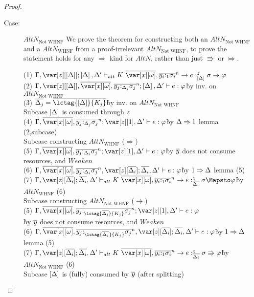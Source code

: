 \begin{proof}
\begin{description}
\item[Case:] $AltN_{\textrm{Not WHNF}}$
    We prove the theorem for constructing both an $AltN_{\textrm{Not WHNF}}$
        and a $AltN_{\textrm{WHNF}}$ from a proof-irrelevant $AltN_{\textrm{Not
        WHNF}}$, to prove the statement holds for any $\Rightarrow$ kind for
        $AltN$, rather than just $\Rrightarrow$ or $\Mapsto$.
\begin{tabbing}
    (1) $\G, \z[\irr{\D}]; \irr{\D}, \D' \vdash_{alt} K~\ov{\xo},\ov{y_i{:}_{1}\s_i}^n\to e :^z_{\irr{\D}} \s \Rrightarrow \vp$\\
    (2) $\G,\z[\irr{\D}],\ov{\xo},\ov{y_j{:}_{\D_j}\s_j}^n; \irr{\D}, \D' \vdash e : \vp$\`by inv. on $AltN_{\textrm{Not WHNF}}$\\
    (3) $\ov{\D_j} = \ov{\lctag{\irr{\D}}{K_j}}$\`by inv. on $AltN_{\textrm{Not WHNF}}$\\
    Subcase $\left[\Delta\right]$ is consumed through $z$\\
    (4) $\G,\ov{\xo},\ov{y_j{:}_{\D_j}\s_j}^n; \z[1], \D' \vdash e : \vp$\`by $\Delta \Rightarrow 1$ lemma (2,subcase)\\
    Subcase constructing $AltN_{\textrm{WHNF}}$ ($\Mapsto$)\\
    (5) $\G,\ov{\xo},\ov{y_j{:}_{\D_i}\s_j}^n; \z[1], \D' \vdash e : \vp$\`by $\overline{y}$ does not consume resources, and $Weaken$\\
    (6) $\G,\ov{\xo},\ov{y_j{:}_{\D_i}\s_j}^n, \z[\ov{\D_i}]; \ov{\D_i}, \D' \vdash e : \vp$\`by $1 \Rightarrow \Delta$ lemma (5)\\
    (7) $\G, \z[\ov{\D_i}]; \ov{\D_i}, \D' \vdash_{alt} K~\ov{\xo},\ov{y_i{:}_{1}\s_i}^n \to e :^z_{\ov{\D_i}} \s \Mapsto \vp$\`by $AltN_{\textrm{WHNF}}$ (6)\\
    Subcase constructing $AltN_{\textrm{Not WHNF}}$ ($\Rrightarrow$)\\
    (5) $\G,\ov{\xo},\ov{y_j{:}_{\lctag{\ov{\D_i}}{K_j}}\s_j}^n; \z[1], \D' \vdash e : \vp$\\\`by $\overline{y}$ does not consume resources, and $Weaken$\\
    (6) $\G,\ov{\xo},\ov{y_j{:}_{\lctag{\ov{\D_i}}{K_j}}\s_j}^n, \z[\ov{\D_i}]; \ov{\D_i}, \D' \vdash e : \vp$\`by $1 \Rightarrow \Delta$ lemma (5)\\
    (7) $\G, \z[\ov{\D_i}]; \ov{\D_i}, \D' \vdash_{alt} K~\ov{\xo},\ov{y_i{:}_{1}\s_i}^n \to e :^z_{\ov{\D_i}} \s \Rrightarrow \vp$\`by $AltN_{\textrm{Not WHNF}}$ (6)\\
    Subcase $\left[\Delta\right]$ is (fully) consumed by $\overline{y}$ (after splitting)\\

\end{tabbing}
\end{description}
\end{proof}
